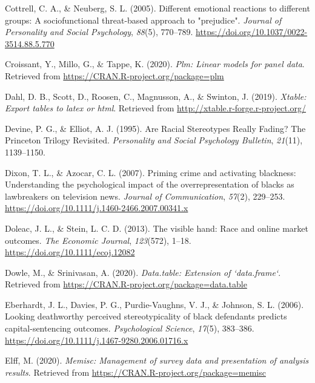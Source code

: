 \documentclass[
  english,
  man, noextraspace,floatsintext]{apa6}
\newlength{\cslhangindent}
\newenvironment{cslreferences}%
  {\setlength{\parindent}{0pt}%
  \everypar{\setlength{\hangindent}{\cslhangindent}}\ignorespaces}%
  {\par}
\begin{document}
\begin{cslreferences}
\leavevmode\hypertarget{ref-Cottrell2005}{}%
Cottrell, C. A., \& Neuberg, S. L. (2005). Different emotional reactions to different groups: A sociofunctional threat-based approach to "prejudice". \emph{Journal of Personality and Social Psychology}, \emph{88}(5), 770--789. \url{https://doi.org/10.1037/0022-3514.88.5.770}

\leavevmode\hypertarget{ref-R-plm}{}%
Croissant, Y., Millo, G., \& Tappe, K. (2020). \emph{Plm: Linear models for panel data}. Retrieved from \url{https://CRAN.R-project.org/package=plm}

\leavevmode\hypertarget{ref-R-xtable}{}%
Dahl, D. B., Scott, D., Roosen, C., Magnusson, A., \& Swinton, J. (2019). \emph{Xtable: Export tables to latex or html}. Retrieved from \url{http://xtable.r-forge.r-project.org/}

\leavevmode\hypertarget{ref-Devine1995}{}%
Devine, P. G., \& Elliot, A. J. (1995). Are Racial Stereotypes Really Fading? The Princeton Trilogy Revisited. \emph{Personality and Social Psychology Bulletin}, \emph{21}(11), 1139--1150.

\leavevmode\hypertarget{ref-Dixon2007}{}%
Dixon, T. L., \& Azocar, C. L. (2007). Priming crime and activating blackness: Understanding the psychological impact of the overrepresentation of blacks as lawbreakers on television news. \emph{Journal of Communication}, \emph{57}(2), 229--253. \url{https://doi.org/10.1111/j.1460-2466.2007.00341.x}

\leavevmode\hypertarget{ref-Doleac2013}{}%
Doleac, J. L., \& Stein, L. C. D. (2013). The visible hand: Race and online market outcomes. \emph{The Economic Journal}, \emph{123}(572), 1--18. \url{https://doi.org/10.1111/ecoj.12082}

\leavevmode\hypertarget{ref-R-data.table}{}%
Dowle, M., \& Srinivasan, A. (2020). \emph{Data.table: Extension of `data.frame`}. Retrieved from \url{https://CRAN.R-project.org/package=data.table}

\leavevmode\hypertarget{ref-Eberhardt2006}{}%
Eberhardt, J. L., Davies, P. G., Purdie-Vaughns, V. J., \& Johnson, S. L. (2006). Looking deathworthy perceived stereotypicality of black defendants predicts capital-sentencing outcomes. \emph{Psychological Science}, \emph{17}(5), 383--386. \url{https://doi.org/10.1111/j.1467-9280.2006.01716.x}

\leavevmode\hypertarget{ref-R-memisc}{}%
Elff, M. (2020). \emph{Memisc: Management of survey data and presentation of analysis results}. Retrieved from \url{https://CRAN.R-project.org/package=memisc}


\end{cslreferences}
\end{document}
